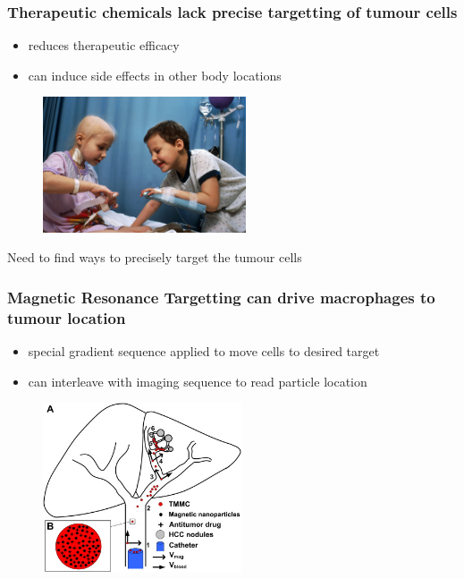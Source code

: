 \documentclass[8pt,xcolor=table]{beamer}
\begin{document}
\begin{frame}
\frametitle{Therapeutic chemicals lack precise targetting of tumour cells}

\begin{itemize}
 \item reduces therapeutic efficacy
 \item can induce side effects in other body locations
\end{itemize}

\begin{figure}
 \centering
\includegraphics[height=4cm]{hair_loss}
\end{figure}

Need to find ways to precisely target the tumour cells
\vspace{1em}



\end{frame}

\begin{frame}
\frametitle{Magnetic Resonance Targetting can drive macrophages to tumour location}

\begin{itemize}
 \item special gradient sequence applied to move cells to desired target
 \item can interleave with imaging sequence to read particle location 
\end{itemize}


\begin{figure}
\centering
\includegraphics[height=5cm]{steering}
\end{figure}

 
\end{frame}
\end{document}
